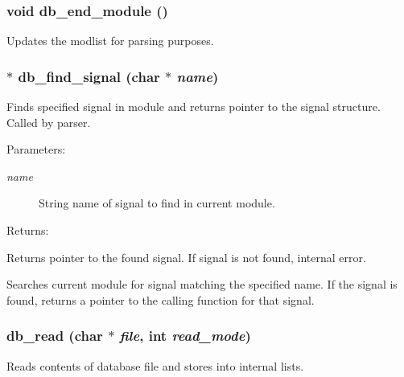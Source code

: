 \subsubsection{\setlength{\rightskip}{0pt plus 5cm}void db\_\-end\_\-module ()}\label{db_8c_a19}


Updates the modlist for parsing purposes. 
\subsubsection{$\ast$ db\_\-find\_\-signal (char $\ast$ {\em name})}\label{db_8c_a21}


Finds specified signal in module and returns pointer to the signal structure. Called by parser.

\begin{Desc}
\item[Parameters: ]\par
\begin{description}
\item[{\em 
name}]String name of signal to find in current module.\end{description}
\end{Desc}
\begin{Desc}
\item[Returns: ]\par
Returns pointer to the found signal. If signal is not found, internal error.\end{Desc}
Searches current module for signal matching the specified name. If the signal is found, returns a pointer to the calling function for that signal. 
\subsubsection{ db\_\-read (char $\ast$ {\em file}, int {\em read\_\-mode})}\label{db_8c_a16}


Reads contents of database file and stores into internal lists.

